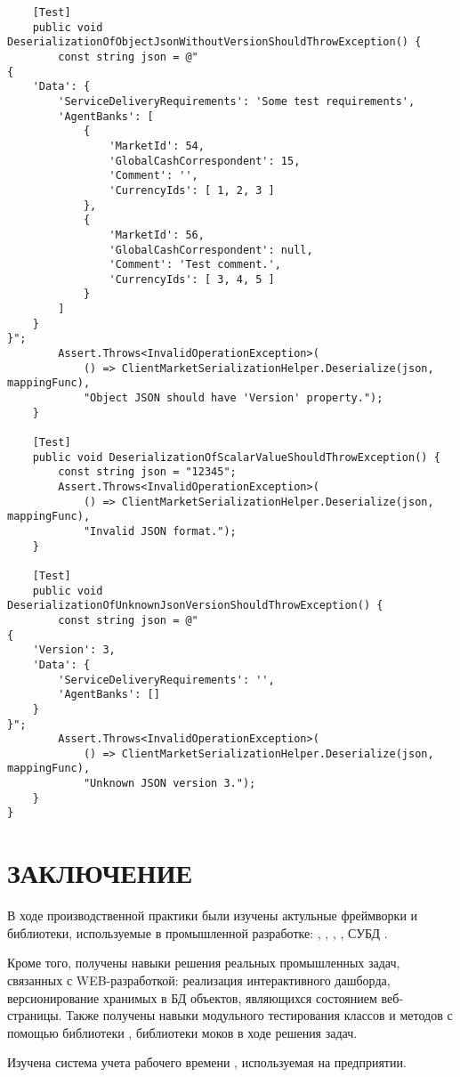 \documentclass[a4paper,14pt]{extarticle}
\begin{document}
\begin{lstlisting}
    [Test]
    public void DeserializationOfObjectJsonWithoutVersionShouldThrowException() {
        const string json = @"
{
    'Data': {
        'ServiceDeliveryRequirements': 'Some test requirements',
        'AgentBanks': [
            {
                'MarketId': 54,
                'GlobalCashCorrespondent': 15,
                'Comment': '',
                'CurrencyIds': [ 1, 2, 3 ]
            },
            {
                'MarketId': 56,
                'GlobalCashCorrespondent': null,
                'Comment': 'Test comment.',
                'CurrencyIds': [ 3, 4, 5 ]
            }
        ]
    }
}";
        Assert.Throws<InvalidOperationException>(
            () => ClientMarketSerializationHelper.Deserialize(json, mappingFunc),
            "Object JSON should have 'Version' property.");
    }

    [Test]
    public void DeserializationOfScalarValueShouldThrowException() {
        const string json = "12345";
        Assert.Throws<InvalidOperationException>(
            () => ClientMarketSerializationHelper.Deserialize(json, mappingFunc),
            "Invalid JSON format.");
    }

    [Test]
    public void DeserializationOfUnknownJsonVersionShouldThrowException() {
        const string json = @"
{
    'Version': 3,
    'Data': {
        'ServiceDeliveryRequirements': '',
        'AgentBanks': []
    }
}";
        Assert.Throws<InvalidOperationException>(
            () => ClientMarketSerializationHelper.Deserialize(json, mappingFunc),
            "Unknown JSON version 3.");
    }
}
\end{lstlisting}

\section{ЗАКЛЮЧЕНИЕ}
В ходе производственной практики были изучены актульные фреймворки и библиотеки,
используемые в промышленной  разработке: , ,
, , СУБД .

Кроме того, получены навыки решения реальных промышленных задач, связанных с WEB-разработкой:
реализация интерактивного дашборда, версионирование хранимых в БД объектов, являющихся состоянием
веб-страницы. Также получены навыки модульного тестирования классов и методов с помощью библиотеки
, библиотеки моков  в ходе решения задач.

Изучена система учета рабочего времени , используемая на предприятии.
\end{document}
